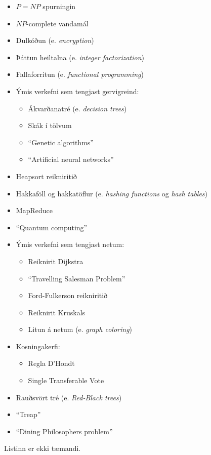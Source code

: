 \documentclass{article}
\begin{document}
\begin{itemize}
 \item $P = NP$ spurningin
 \item $NP$-complete vandamál
 \item Dulkóðun (e. \emph{encryption})
 \item Þáttun heiltalna (e. \emph{integer factorization}) 
 \item Fallaforritun (e. \emph{functional programming})
 \item Ýmis verkefni sem tengjast gervigreind:
 \begin{itemize}
  \item Ákvarðanatré (e. \emph{decision trees})
  \item Skák í tölvum
  \item ``Genetic algorithms''
  \item ``Artificial neural networks''
 \end{itemize}
 \item Heapsort reikniritið
 \item Hakkaföll og hakkatöflur (e. \emph{hashing functions} og \emph{hash tables})
 \item MapReduce
 \item ``Quantum computing''
 \item Ýmis verkefni sem tengjast netum:
 \begin{itemize}
  \item Reiknirit Dijkstra
  \item ``Travelling Salesman Problem''
  \item Ford-Fulkerson reikniritið
  \item Reiknirit Kruskals
  \item Litun á netum (e. \emph{graph coloring})
 \end{itemize}
 \item Kosningakerfi:
 \begin{itemize}
  \item Regla D'Hondt
  \item Single Transferable Vote
 \end{itemize}
 \item Rauðsvört tré (e. \emph{Red-Black trees})
 \item ``Treap''
 \item ``Dining Philosophers problem''
\end{itemize}
Listinn er ekki tæmandi.
\end{document}
